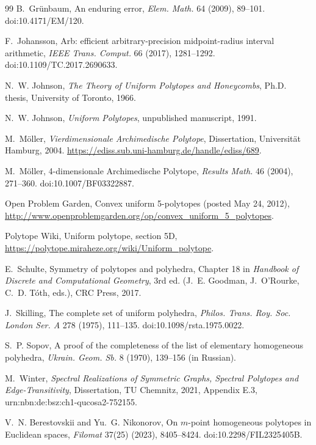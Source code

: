\documentclass[11pt]{article}
\theoremstyle{definition}
\theoremstyle{remark}
\begin{document}
\begin{thebibliography}{99}
B.~Grünbaum, An enduring error, \emph{Elem. Math.} 64 (2009), 89--101.
doi:10.4171/EM/120.

F.~Johansson, Arb: efficient arbitrary-precision midpoint-radius interval
arithmetic, \emph{IEEE Trans. Comput.} 66 (2017), 1281--1292.
doi:10.1109/TC.2017.2690633.

N.~W. Johnson, \emph{The Theory of Uniform Polytopes and Honeycombs}, Ph.D.
thesis, University of Toronto, 1966.

N.~W. Johnson, \emph{Uniform Polytopes}, unpublished manuscript, 1991.

M.~Möller, \emph{Vierdimensionale Archimedische Polytope}, Dissertation,
Universität Hamburg, 2004. \url{https://ediss.sub.uni-hamburg.de/handle/ediss/689}.

M.~Möller, 4-dimensionale Archimedische Polytope, \emph{Results Math.} 46
(2004), 271--360. doi:10.1007/BF03322887.

Open Problem Garden, Convex uniform 5-polytopes (posted May 24, 2012),
\url{http://www.openproblemgarden.org/op/convex_uniform_5_polytopes}.

Polytope Wiki, Uniform polytope, section 5D,
\url{https://polytope.miraheze.org/wiki/Uniform_polytope}.

E.~Schulte, Symmetry of polytopes and polyhedra, Chapter 18 in
\emph{Handbook of Discrete and Computational Geometry}, 3rd ed.
(J.~E. Goodman, J.~O'Rourke, C.~D. Tóth, eds.), CRC Press, 2017.

J.~Skilling, The complete set of uniform polyhedra, \emph{Philos. Trans.
Roy. Soc. London Ser. A} 278 (1975), 111--135. doi:10.1098/rsta.1975.0022.

S.~P. Sopov, A proof of the completeness of the list of elementary
homogeneous polyhedra, \emph{Ukrain. Geom. Sb.} 8 (1970), 139--156 (in
Russian).

M.~Winter, \emph{Spectral Realizations of Symmetric Graphs, Spectral
Polytopes and Edge-Transitivity}, Dissertation, TU Chemnitz, 2021,
Appendix E.3, urn:nbn:de:bsz:ch1-qucosa2-752155.

V.~N. Berestovskii and Yu.~G. Nikonorov, On $m$-point homogeneous
polytopes in Euclidean spaces, \emph{Filomat} 37(25) (2023), 8405--8424.
doi:10.2298/FIL2325405B.

\end{thebibliography}
\end{document}
